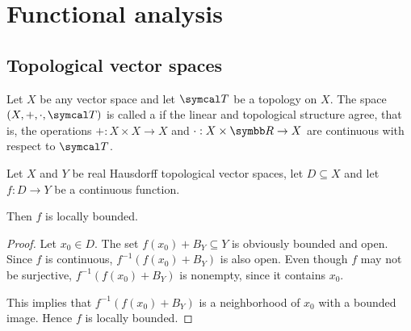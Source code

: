 \section{Functional analysis}\label{sec:functional_analysis}
\subsection{Topological vector spaces}\label{subsec:topological_vector_spaces}

\begin{definition}\label{def:topological_vector_space}
  Let \( X \) be any vector space and let \( \Cal{T} \) be a topology on \( X \). The space \( (X, +, \cdot, \Cal{T}) \) is called a  if the linear and topological structure agree, that is, the operations \( +: X \times X \to X \) and \( \cdot: X \times \R \to X \) are continuous with respect to \( \Cal{T} \).
\end{definition}

\begin{proposition}\label{thm:continuous_implies_locally_bounded}
  Let \( X \) and \( Y \) be real Hausdorff topological vector spaces, let \( D \subseteq X \) and let \( f: D \to Y \) be a continuous function.

  Then \( f \) is locally bounded.
\end{proposition}
\begin{proof}
  Let \( x_0 \in D \). The set \( f(x_0) + B_Y \subseteq Y \) is obviously bounded and open. Since \( f \) is continuous, \( f^{-1}(f(x_0) + B_Y) \) is also open. Even though \( f \) may not be surjective, \( f^{-1}(f(x_0) + B_Y) \) is nonempty, since it contains \( x_0 \).

  This implies that \( f^{-1}(f(x_0) + B_Y) \) is a neighborhood of \( x_0 \) with a bounded image. Hence \( f \) is locally bounded.
\end{proof}
